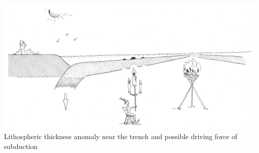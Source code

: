 \vspace{1cm}

\begin{center}
\includegraphics[width=14cm]{images/interesting/futo85}\\
{\tiny Lithospheric thickness anomaly near the trench and possible driving force of subduction \cite{futo85}}
\end{center}
